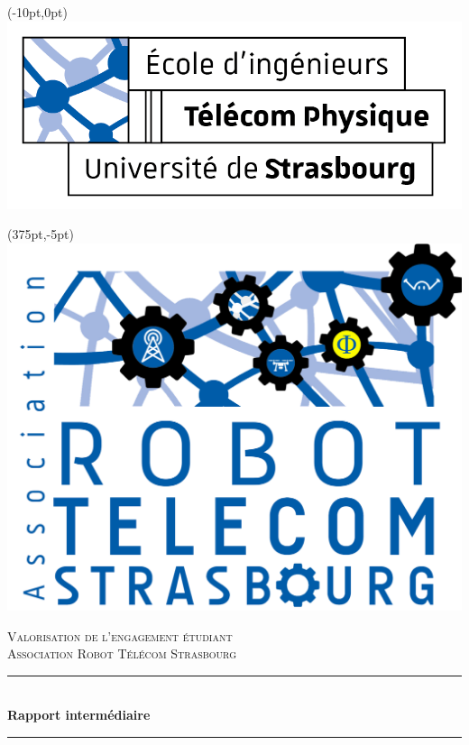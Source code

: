 \documentclass[11pt,a4paper]{report}
\newcommand{\HRule}{\rule{\linewidth}{0.5mm}} %
\begin{document}
\begin{titlepage}

	\begin{textblock*}{6cm}(-10pt,0pt)
	\includegraphics[scale=0.7]{logo_tps.png}
	\end{textblock*}

	\begin{textblock*}{6cm}(375pt,-5pt)
	\includegraphics[scale=0.06]{logo_arts.png}
	\end{textblock*}


  \begin{sffamily}
    \begin{center}

      \vfill
      \textsc{\LARGE Valorisation de l'engagement étudiant}\\[0.5cm]

      \textsc{\Large Association Robot Télécom Strasbourg}\\[1cm]

      \HRule\\[0.4cm]
      {\huge \bfseries Rapport intermédiaire\\[0.4cm]}
      \HRule\\[1cm]


\end{center}
\end{sffamily}
\end{titlepage}
\end{document}
